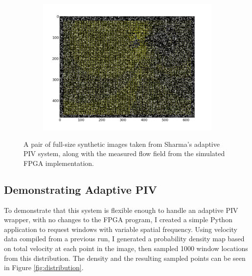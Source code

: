 \documentclass{article}
\begin{document}
\begin{figure}
	\begin{subfigure}[htb]{\textwidth}
		\centerline{\includegraphics[trim = .4in .4in .4in .4in, clip, width=1.5\textwidth]{fig/vort_sim_non_adapt.png}}
	\end{subfigure}
	\caption{A pair of full-size synthetic images taken from Sharma's adaptive PIV system, along with the measured flow field from the simulated FPGA implementation.}
	\label{fig:full_test}
\end{figure}

\subsection{Demonstrating Adaptive PIV}
To demonstrate that this system is flexible enough to handle an adaptive PIV wrapper, with no changes to the FPGA program, I created a simple Python application to request windows with variable spatial frequency. Using velocity data compiled from a previous run, I generated a probability density map based on total velocity at each point in the image, then sampled 1000 window locations from this distribution. The density and the resulting sampled points can be seen in Figure \ref{fig:distribution}. 
\end{document}
